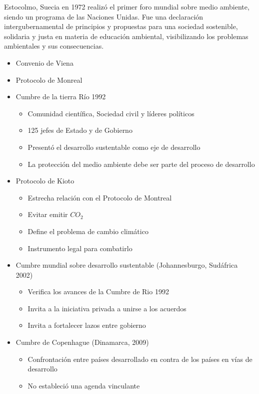 Estocolmo, Suecia en 1972 realizó el primer foro mundial sobre medio ambiente, siendo un programa de las Naciones Unidas. Fue una declaración intergubernamental de principios y propuestas para una sociedad sostenible, solidaria y justa en materia de educación ambiental, visibilizando los problemas ambientales y sus consecuencias.
\begin{itemize}
    \item Convenio de Viena
    \item Protocolo de Monreal
    \item Cumbre de la tierra Río 1992 \begin{itemize}
        \item Comunidad científica, Sociedad civil y líderes políticos
        \item 125 jefes de Estado y de Gobierno
        \item Presentó el desarrollo sustentable como eje de desarrollo
        \item La protección del medio ambiente debe ser parte del proceso de desarrollo
    \end{itemize}
    \item Protocolo de Kioto \begin{itemize}
        \item Estrecha relación con el Protocolo de Montreal
        \item Evitar emitir $CO_2$
        \item Define el problema de cambio climático
        \item Instrumento legal para combatirlo
    \end{itemize}
    \item Cumbre mundial sobre desarrollo sustentable (Johannesburgo, Sudáfrica 2002) \begin{itemize}
        \item Verifica los avances de la Cumbre de Rio 1992
        \item Invita a la iniciativa privada a unirse a los acuerdos
        \item Invita a fortalecer lazos entre gobierno
    \end{itemize}
    \item Cumbre de Copenhague (Dinamarca, 2009) \begin{itemize}
        \item Confrontación entre países desarrollado en contra de los países en vías de desarrollo
        \item No estableció una agenda vinculante

\end{itemize}
\end{itemize}
